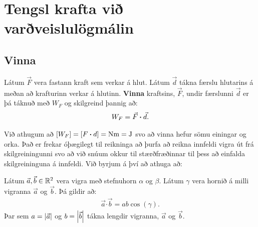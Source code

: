 
\newpage

\chapter{Tengsl krafta við varðveislulögmálin}

\section{Vinna}

\begin{tcolorbox}
\begin{definition}
Látum $\Vec{F}$ vera fastann kraft sem verkar á hlut. Látum $\Vec{d}$ tákna færslu hlutarins á meðan að krafturinn verkar á hlutinn. \textbf{Vinna} kraftsins, $\vec{F}$, undir færslunni $\Vec{d}$ er þá táknuð með $W_{F}$ og skilgreind þannig að:
\begin{align*}
    W_{F} = \vec{F} \vdot \vec{d}.
\end{align*}
\end{definition}
\end{tcolorbox}

Við athugum að $\left[W_F\right] = \left[ F \vdot d  \right] = \SI{}{Nm} = \SI{}{J}$ svo að vinna hefur sömu einingar og orka. Það er frekar óþægilegt til reikninga að þurfa að reikna innfeldi vigra út frá skilgreiningunni svo að við snúum okkur til stærðfræðinnar til þess að einfalda skilgreininguna á innfeldi. Við byrjum á því að athuga að:

\begin{tcolorbox}
\begin{setning}
Látum $\vec{a}, \vec{b} \in \mathbb{R}^2$ vera vigra með stefnuhorn $\alpha$ og $\beta$. Látum $\gamma$ vera hornið á milli vigranna $\vec{a}$ og $\vec{b}$. Þá gildir að:
\begin{align*}
    \vec{a} \bm{\cdot} \vec{b} = ab \cos(\gamma).
\end{align*}
Þar sem $a = \abs{\vec{a}}$ og $b = \abs{\vec{b}}$ tákna lengdir vigranna, $\vec{a}$ og $\vec{b}$.
\end{setning}
\end{tcolorbox}

